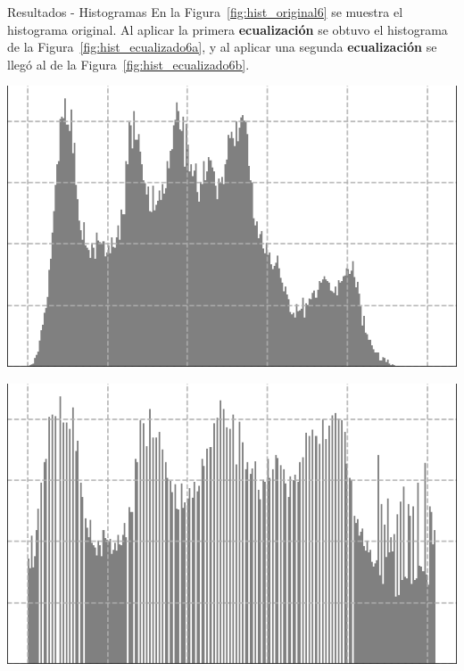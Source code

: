 \documentclass{beamer}
\begin{document}
\begin{frame}[fragile]{Resultados - Histogramas}
	\justifying
	En la Figura~\ref{fig:hist_original6} se muestra el histograma original.  
	Al aplicar la primera \textcolor{unahurverde}{\textbf{ecualización}} se obtuvo el histograma de la Figura~\ref{fig:hist_ecualizado6a},  
	y al aplicar una segunda \textcolor{unahurverde}{\textbf{ecualización}} se llegó al de la Figura~\ref{fig:hist_ecualizado6b}.
	
	\vspace{0.5cm}
	\centering
	\begin{minipage}{0.32\linewidth}
		\centering
		\includegraphics[width=\linewidth]{../results/lena_hist_gris}
		\label{fig:hist_original6}
	\end{minipage}\hfill
	\begin{minipage}{0.32\linewidth}
		\centering
		\includegraphics[width=\linewidth]{../results/lena_hist_gris_ecualizado}

\end{minipage}
\end{frame}
\end{document}
